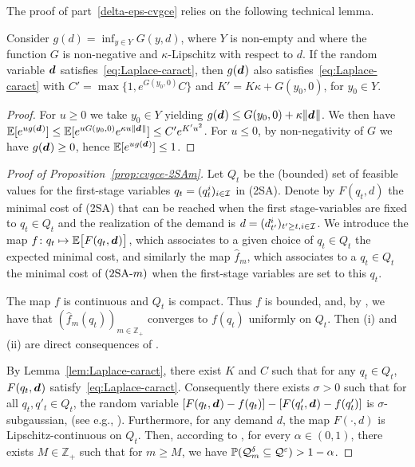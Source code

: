 The proof of part~\ref{delta-eps-cvgce} relies on the following technical lemma.
\begin{lem}
\label{lem:Laplace-caract}
Consider $g(d) = \inf_{y \in Y} G(y,d)$, where $Y$ is non-empty and where the function $G$
is non-negative and $\kappa$-Lipschitz with respect to $d$.
If the random variable $\va d$ satisfies~\eqref{eq:Laplace-caract},
then $g(\va d)$ also satisfies~\eqref{eq:Laplace-caract}
with $C' = \max \{ 1 , e^{G(y_0,0)}C\}$ and $K' = K \kappa + G(y_0,0)$, for $y_0 \in Y$.
\end{lem}
\begin{proof}
For $u \geq 0$ we take $y_0 \in Y$ yielding $g(\va d) \leq  G(y_0,0) + \kappa \|\va d\|$.
We then have $ \EE[e^{u g(\va d)}] \leq  \EE[e^{uG(y_0,0)} e^{\kappa u \|\va d\|}] \leq C' e^{ K' u^2}$.
For $u\leq 0$, by non-negativity of $G$ we have $g({\va d}) \geq 0$, hence $\EE[e^{u g(\va d)}] \leq 1$.
\end{proof}

\begin{proof}[Proof of Proposition~\ref{prop:cvgce-2SAm}]
Let $Q_t$ be the (bounded) set of feasible values for the first-stage variables $q_t=(q_t^i)_{i\in\mathcal{I}}$ in (2SA).
Denote by $F(q_t,d)$ the minimal cost of (2SA) that can be reached when the first stage-variables are fixed to $q_t\in Q_t$  and the realization of the demand is $d=(d_{t'}^i)_{t' \geq t, i\in\mathcal{I}}$.
We introduce the map $f\colon q_t\mapsto \espe\sqbracket{F(q_t,\va d)}$, which associates to a given choice of $q_t\in Q_t$ the expected minimal cost, and similarly the map $\hat f_m$, which associates to a $q_t\in Q_t$ the minimal cost of $\textup{(2SA-$m$)}$ when the first-stage variables are set to this $q_t$.

The map $f$ is continuous and $Q_t$ is compact. Thus $f$ is bounded, and, by \cite[Theorem 7.48]{Shapiro2009}, we have that $(\hat f_m(q_t))_{m\in\mathbb{Z}_+}$ converges to $f(q_t)$ uniformly on $Q_t$. Then (i) and (ii) are direct consequences of \cite[Theorem 5.3]{Shapiro2009}.

By Lemma~\ref{lem:Laplace-caract}, there exist $K$ and $C$ such that for any $q_t \in Q_t$, $F(q_t,\va d)$ satisfy~\eqref{eq:Laplace-caract}.
Consequently there exists $\sigma >0$ such that for all $q_t, q'_t \in Q_t$, the random variable $[F(q_t,\va d) - f(q_t)] - [F(q'_t,\va d) - f(q'_t)] $ is $\sigma$-subgaussian, (see e.g., \cite{Vershynin2010}).
Furthermore, for any demand $d$, the map $F(\cdot,d)$ is %
Lipschitz-continuous on $Q_t$. Then, according to \cite[Theorem 5.18]{Shapiro2009}, for every $\alpha\in(0,1)$, there exists $M \in \mathbb{Z}_+$ such that for $m\geq M$, we have $ \mathbb{P}(\mathcal{Q}_m^{\delta}\subseteq\mathcal{Q}^{\varepsilon}) > 1 - \alpha$.
\end{proof}

